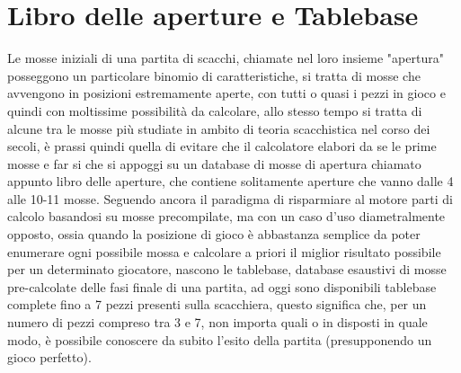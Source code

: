 \section {Libro delle aperture e Tablebase}
Le mosse iniziali di una partita di scacchi, chiamate nel loro insieme "apertura" posseggono un particolare binomio di caratteristiche, si tratta di mosse che avvengono in posizioni estremamente aperte, con tutti o quasi i pezzi
in gioco e quindi con moltissime possibilità da calcolare, allo stesso tempo si tratta di alcune tra le mosse più studiate in ambito di teoria scacchistica nel corso dei secoli, è prassi quindi quella di evitare che
il calcolatore elabori da se le prime mosse e far si che si appoggi su un database di mosse di apertura chiamato appunto libro delle aperture, che contiene solitamente aperture che vanno dalle 4 alle 10-11 mosse.
Seguendo ancora il paradigma di risparmiare al motore parti di calcolo basandosi su mosse precompilate, ma con un caso d'uso diametralmente opposto, ossia quando la posizione di gioco è abbastanza semplice
da poter enumerare ogni possibile mossa e calcolare a priori il miglior risultato possibile per un determinato giocatore, nascono le tablebase, database esaustivi di mosse pre-calcolate delle fasi finale di una 
partita, ad oggi sono disponibili tablebase complete fino a 7 pezzi presenti sulla scacchiera, questo significa che, per un numero di pezzi compreso tra 3 e 7, non importa quali o in disposti in quale modo,
è possibile conoscere da subito l'esito della partita (presupponendo un gioco perfetto).
